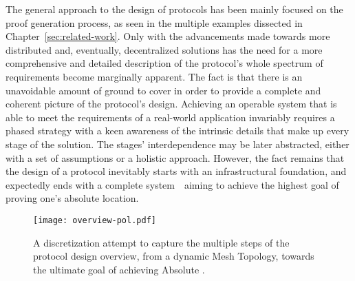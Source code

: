 The general approach to the design of \pol{} protocols has been mainly focused on the proof generation process, as seen in the multiple examples dissected in Chapter~\ref{sec:related-work}. Only with the advancements made towards more distributed and, eventually, decentralized solutions has the need for a more comprehensive and detailed description of the protocol's whole spectrum of requirements become marginally apparent. The fact is that there is an unavoidable amount of ground to cover in order to provide a complete and coherent picture of the protocol's design. Achieving an operable system that is able to meet the requirements of a real-world application invariably requires a phased strategy with a keen awareness of the intrinsic details that make up every stage of the solution. The stages' interdependence may be later abstracted, either with a set of assumptions or a holistic approach. However, the fact remains that the design of a \pol{} protocol inevitably starts with an infrastructural foundation, and expectedly ends with a complete system~\textemdash~aiming to achieve the highest goal of proving one's absolute location.

\begin{figure}[ht]
    \begin{center}
    \texttt{[image: overview-pol.pdf]}
    \caption{A discretization attempt to capture the multiple steps of the protocol design overview, from a dynamic Mesh Topology, towards the ultimate goal of achieving Absolute \pol.}
    \label{fig:proof-of-location-overview}
    \end{center}
\end{figure}

